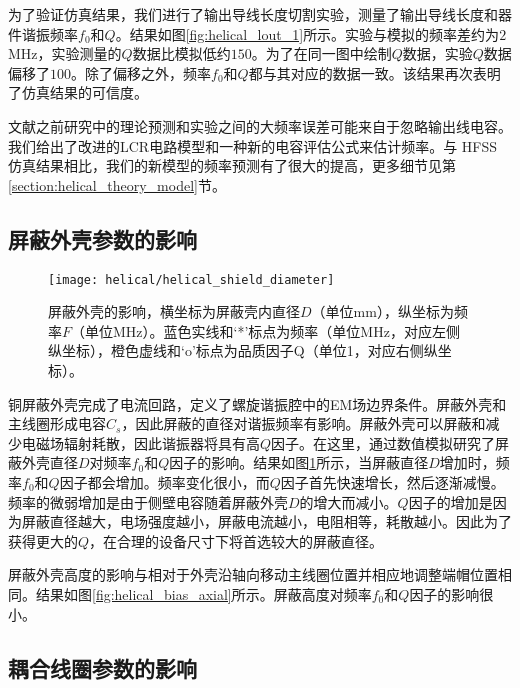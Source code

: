 为了验证仿真结果，我们进行了输出导线长度切割实验，测量了输出导线长度和器件谐振频率$f_0$和$Q$。结果如图\ref{fig:helical_lout_1}所示。实验与模拟的频率差约为$2$MHz，实验测量的$Q$数据比模拟低约$150$。为了在同一图中绘制$ Q $数据，实验$ Q $数据偏移了$ 100$。除了偏移之外，频率$f_0$和$ Q $都与其对应的数据一致。该结果再次表明了仿真结果的可信度。

文献\cite[]{Gandolfi_Niedermayr_Kumph_Brownnutt_Blatt_2012,Macalpine_Schildknecht_1959, Deng_Sun_Yuan_Xu_Zhang_Lu_Luo_2014}之前研究中的理论预测和实验之间的大频率误差可能来自于忽略输出线电容\cite[]{Nandi_Sikdar_Das_Ray_2022, Batra_Panja_De_Roy_Majhi_Yadav_Sen_Gupta_2017}。我们给出了改进的LCR电路模型和一种新的电容评估公式来估计频率。与 HFSS 仿真结果相比，我们的新模型的频率预测有了很大的提高，更多细节见第\ref{section:helical_theory_model}节。

\subsection[屏蔽外壳参数的影响]{屏蔽外壳参数的影响}
\begin{figure}
    \centering
    \caption[屏蔽外壳的影响]{屏蔽外壳的影响，横坐标为屏蔽壳内直径$D$（单位mm），纵坐标为频率$F$（单位MHz）。蓝色实线和‘*’标点为频率（单位MHz，对应左侧纵坐标），橙色虚线和‘o’标点为品质因子Q（单位1，对应右侧纵坐标）。\label{fig:helical_shield_diameter}}
    \texttt{[image: helical/helical\_shield\_diameter]}
\end{figure}

铜屏蔽外壳完成了电流回路，定义了螺旋谐振腔中的EM场边界条件。屏蔽外壳和主线圈形成电容$C_s$，因此屏蔽的直径对谐振频率有影响。屏蔽外壳可以屏蔽和减少电磁场辐射耗散，因此谐振器将具有高$Q$因子。在这里，通过数值模拟研究了屏蔽外壳直径$ D $对频率$f_0$和$ Q $因子的影响。结果如图\ref{fig:helical_shield_diameter}所示，当屏蔽直径$ D $增加时，频率$f_0$和$ Q $因子都会增加。频率变化很小，而$ Q $因子首先快速增长，然后逐渐减慢。频率的微弱增加是由于侧壁电容随着屏蔽外壳$D$的增大而减小。$Q$因子的增加是因为屏蔽直径越大，电场强度越小，屏蔽电流越小，电阻相等，耗散越小。因此为了获得更大的$Q$，在合理的设备尺寸下将首选较大的屏蔽直径。

屏蔽外壳高度的影响与相对于外壳沿轴向移动主线圈位置并相应地调整端帽位置相同。结果如图\ref{fig:helical_bias_axial}所示。屏蔽高度对频率$f_0$和$Q$因子的影响很小。

\subsection[耦合线圈参数的影响]{耦合线圈参数的影响}

